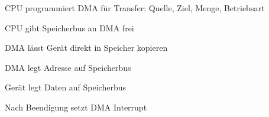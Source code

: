 \documentclass[8pt,landscape,a4paper]{scrartcl}
\begin{document}
\begin{multicols*}{5}
\begin{compactenum} [1.]
	\item CPU programmiert DMA für Transfer: Quelle, Ziel, Menge, Betriebsart
	\item CPU gibt Speicherbus an DMA frei
	\item DMA lässt Gerät direkt in Speicher kopieren
	\item DMA legt Adresse auf Speicherbus
	\item Gerät legt Daten auf Speicherbus
	\item Nach Beendigung setzt DMA Interrupt
\end{compactenum}



	\end{multicols*}
\end{document}
